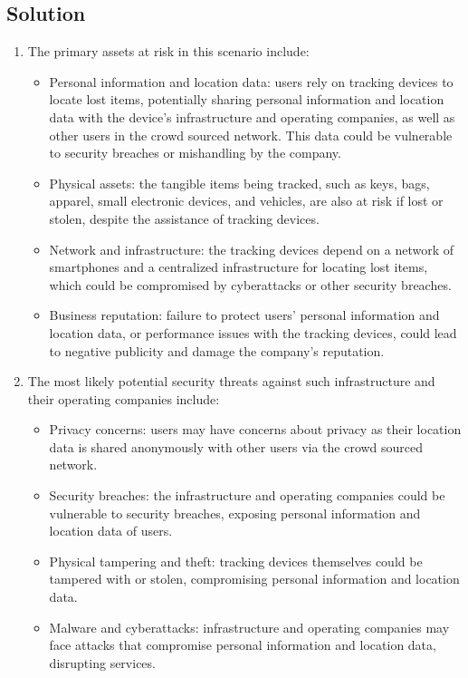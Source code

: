 \subsection*{Solution}
\begin{enumerate}
    \item The primary assets at risk in this scenario include:
        \begin{itemize}
            \item Personal information and location data: users rely on tracking devices to locate lost items, potentially sharing personal information and location data with the device's infrastructure and operating companies, as well as other users in the crowd sourced network. 
                This data could be vulnerable to security breaches or mishandling by the company.
            \item Physical assets: the tangible items being tracked, such as keys, bags, apparel, small electronic devices, and vehicles, are also at risk if lost or stolen, despite the assistance of tracking devices.
            \item Network and infrastructure: the tracking devices depend on a network of smartphones and a centralized infrastructure for locating lost items, which could be compromised by cyberattacks or other security breaches.
            \item Business reputation: failure to protect users' personal information and location data, or performance issues with the tracking devices, could lead to negative publicity and damage the company's reputation.
        \end{itemize}
    \item The most likely potential security threats against such infrastructure and their operating companies include:
        \begin{itemize}
            \item Privacy concerns: users may have concerns about privacy as their location data is shared anonymously with other users via the crowd sourced network.
            \item Security breaches: the infrastructure and operating companies could be vulnerable to security breaches, exposing personal information and location data of users.
            \item Physical tampering and theft: tracking devices themselves could be tampered with or stolen, compromising personal information and location data.
            \item Malware and cyberattacks: infrastructure and operating companies may face attacks that compromise personal information and location data, disrupting services.

\end{itemize}
\end{enumerate}
